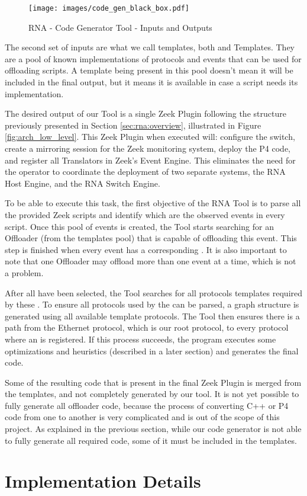 \begin{figure}[htb]
    \caption{RNA - Code Generator Tool - Inputs and Outputs}
    \begin{center}
        \texttt{[image: images/code\_gen\_black\_box.pdf]}  
    \end{center}
    \label{fig:code_gen_black_box}
\end{figure}

The second set of inputs are what we call templates, both \ProtocolTemplates{} and \Offloader{} Templates. They are a pool of known implementations of protocols and events that can be used for offloading scripts. A template being present in this pool doesn't mean it will be included in the final output, but it means it is available in case a script needs its implementation.

The desired output of our Tool is a single Zeek Plugin following the structure previously presented in Section \ref{sec:rna:overview}, illustrated in Figure \ref{fig:arch_low_level}. This Zeek Plugin when executed will: configure the switch, create a mirroring session for the Zeek monitoring system, deploy the P4 code, and register all Translators in Zeek's Event Engine. This eliminates the need for the operator to coordinate the deployment of two separate systems, the RNA Host Engine, and the RNA Switch Engine.

To be able to execute this task, the first objective of the RNA Tool is to parse all the provided Zeek scripts and identify which are the observed events in every script. Once this pool of events is created, the Tool starts searching for an Offloader (from the templates pool) that is capable of offloading this event. This step is finished when every event has a corresponding \Offloader{}. It is also important to note that one Offloader may offload more than one event at a time, which is not a problem.

After all \Offloaders{} have been selected, the Tool searches for all protocols templates required by these \Offloaders{}. To ensure all protocols used by the \Offloaders{} can be parsed, a graph structure is generated using all available template protocols. The Tool then ensures there is a path from the Ethernet protocol, which is our root protocol, to every protocol where an \Offloader{} is registered. If this process succeeds, the program executes some optimizations and heuristics (described in a later section) and generates the final code.

Some of the resulting code that is present in the final Zeek Plugin is merged from the templates, and not completely generated by our tool. It is not yet possible to fully generate all offloader code, because the process of converting C++ or P4 code from one to another is very complicated and is out of the scope of this project. As explained in the previous section, while our code generator is not able to fully generate all required code, some of it must be included in the templates.

\section{Implementation Details}
\label{sec:code_gen_impl}


